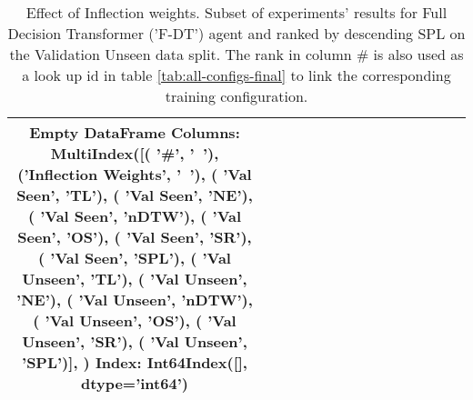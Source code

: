 \begin{table}
\centering
\caption{\label{tab:f_dt_inflection_weights}Effect of Inflection weights. Subset of experiments' results for Full Decision Transformer ('F-DT') agent and ranked by descending SPL on the Validation Unseen data split. The rank in column \# is also used as a look up id in table \ref{tab:all-configs-final} to link the corresponding training configuration.}
\begin{tabular}{@{\hskip3pt}c@{\hskip3pt}c@{\hskip3pt}c@{\hskip3pt}c@{\hskip3pt}c@{\hskip3pt}c@{\hskip3pt}c@{\hskip3pt}c@{\hskip3pt}c@{\hskip3pt}c@{\hskip3pt}c@{\hskip3pt}c@{\hskip3pt}c@{\hskip3pt}c@{\hskip3pt}c}
\toprule
Empty DataFrame
Columns: MultiIndex([(                '\textbf{\#}',    '\textbf{~}'),
            ('\textbf{Inflection Weights}',    '\textbf{~}'),
            (          '\textbf{Val Seen}',   '\textbf{TL}'),
            (          '\textbf{Val Seen}',   '\textbf{NE}'),
            (          '\textbf{Val Seen}', '\textbf{nDTW}'),
            (          '\textbf{Val Seen}',   '\textbf{OS}'),
            (          '\textbf{Val Seen}',   '\textbf{SR}'),
            (          '\textbf{Val Seen}',  '\textbf{SPL}'),
            (        '\textbf{Val Unseen}',   '\textbf{TL}'),
            (        '\textbf{Val Unseen}',   '\textbf{NE}'),
            (        '\textbf{Val Unseen}', '\textbf{nDTW}'),
            (        '\textbf{Val Unseen}',   '\textbf{OS}'),
            (        '\textbf{Val Unseen}',   '\textbf{SR}'),
            (        '\textbf{Val Unseen}',  '\textbf{SPL}')],
           )
Index: Int64Index([], dtype='int64') \\
\bottomrule
\end{tabular}
\end{table}
